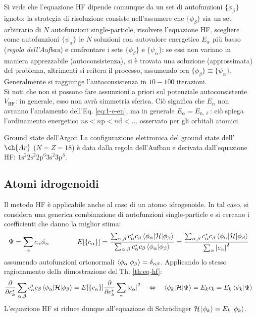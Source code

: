 Si vede che l'equazione HF dipende comunque da un set di autofunzioni $ \{\phi_\beta\} $ ignoto: la strategia di risoluzione consiste nell'assumere che $ \{\phi_\beta\} $ sia un set arbitrario di $ N $ autofunzioni single-particle, risolvere l'equazione HF, scegliere come autofunzioni $ \{\psi_\alpha\} $ le $ N $ soluzioni con autovalore energetico $ E_\alpha $ più basso (\textit{regola dell'Aufbau}) e confrontare i sets $ \{\phi_\beta\} $ e $ \{\psi_\alpha\} $: se essi non variano in maniera apprezzabile (autoconsistenza), si è trovata una soluzione (approssimata) del problema, altrimenti si reitera il processo, assumendo ora $ \{\phi_\beta\} \equiv \{\psi_\alpha\} $. Generalmente si raggiunge l'autoconsistenza in $ 10-100 $ iterazioni. \\
Si noti che non si possono fare assunzioni a priori sul potenziale autoconsistente $ V_\text{HF} $: in  generale, esso non avrà simmetria sferica. Ciò significa che $ E_\alpha $ non avranno l'andamento dell'Eq. \ref{eq:1-e-en}, ma in generale $ E_\alpha = E_{n,\ell} $: ciò spiega l'ordinamento energetico $ n\text{s} < n\text{p} < n\text{d} < \dots $ osservato per gli orbitali atomici.

\begin{example}{Ground state dell'Argon}{}
	La configurazione elettronica del ground state dell'$ \ch{Ar} $ ($ N = Z = 18 $) è data dalla regola dell'Aufbau e derivata dall'equazione HF: $ \text{1s}^2 \text{2s}^2 \text{2p}^6 \text{3s}^2 \text{3p}^6 $.
\end{example}

\subsection{Atomi idrogenoidi}

Il metodo HF è applicabile anche al caso di un atomo idrogenoide. In tal caso, si considera una generica combinazione di autofunzioni single-particle e si cercano i coefficienti che danno la miglior stima:
\begin{equation*}
	\Psi = \sum_\alpha c_\alpha \phi_\alpha
	\qquad \qquad
	E[\{c_\alpha\}] = \frac{\sum_{\alpha,\beta} c_\alpha^* c_\beta \braket{\phi_\alpha | \mathcal{H} | \phi_\beta}}{\sum_{\alpha,\beta} c_\alpha^* c_\beta \braket{\phi_\alpha | \phi_\beta}} = \frac{\sum_{\alpha,\beta} c_\alpha^* c_\beta \braket{\phi_\alpha | \mathcal{H} | \phi_\beta}}{\sum_\alpha \left\lvert c_\alpha\right\rvert^2}
\end{equation*}
assumendo autofunzioni ortonormali $ \braket{\phi_\alpha | \phi_\beta} = \delta_{\alpha\beta} $. Applicando lo stesso ragionamento della dimostrazione del Th. \ref{th:eq-hf}:
\begin{equation*}
	\frac{\partial}{\partial c_k^*} \sum_{\alpha,\beta} c_\alpha^* c_\beta \braket{\phi_\alpha | \mathcal{H} | \phi_\beta} = E[\{c_\alpha\}] \frac{\partial}{\partial c_k^*} \sum_\alpha \left\lvert c_\alpha\right\rvert^2
	\quad \Leftrightarrow \quad
	\braket{\phi_k | \mathcal{H} | \Psi} = E_k c_k = E_k \braket{\phi_k | \Psi}
\end{equation*}
L'equazione HF si riduce dunque all'equazione di Schrödinger $ \mathcal{H} \ket{\phi_k} = E_k \ket{\phi_k} $.

